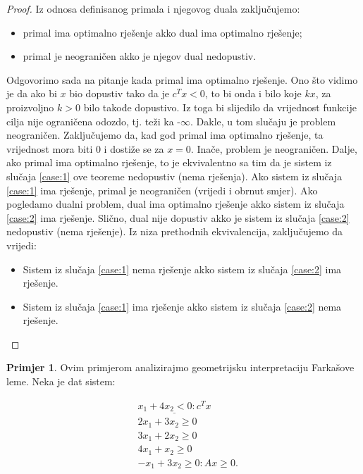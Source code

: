 \documentclass[a4paper, utf8, 11pt, colorlinks]{book}
\theoremstyle{definition}
\newtheorem{primjer}{Primjer}[chapter]
\begin{document}
\begin{proof}
Iz odnosa definisanog primala i njegovog duala zaključujemo:
  \begin{itemize}
  	\item primal ima optimalno rješenje akko  dual ima optimalno rješenje; 
  	\item primal je neograničen  akko je njegov dual nedopustiv.  
  \end{itemize}
  Odgovorimo sada na pitanje kada primal ima optimalno rješenje. Ono što vidimo je da ako bi $x$ bio dopustiv tako da je $c^Tx < 0$,  to bi onda i bilo koje $kx$, za proizvoljno $k>0$ bilo takođe dopustivo. Iz toga bi slijedilo da vrijednost funkcije cilja nije ograničena odozdo, tj. teži ka -$\infty$. Dakle, u tom slučaju je problem neograničen. Zaključujemo da, kad god  primal ima optimalno rješenje, ta vrijednost mora biti 0 i dostiže se za $x =0$. Inače, problem je neograničen. Dalje, ako primal ima optimalno rješenje, to  je ekvivalentno sa tim da je sistem iz slučaja  \ref{case:1} ove teoreme nedopustiv (nema rješenja).  Ako sistem iz slučaja  \ref{case:1}  ima rješenje, primal je neograničen (vrijedi i obrnut smjer). Ako pogledamo   dualni problem, dual ima optimalno rješenje akko sistem iz  slučaja  \ref{case:2}   ima rješenje. Slično, dual nije dopustiv akko je sistem iz  slučaja   \ref{case:2}  nedopustiv (nema rješenje). Iz niza prethodnih ekvivalencija, zaključujemo da vrijedi: 
  \begin{itemize}
  	  \item Sistem iz  slučaja  \ref{case:1}  nema rješenje akko sistem iz  slučaja  \ref{case:2}   ima rješenje. 
  	  \item Sistem iz  slučaja  \ref{case:1}  ima rješenje akko sistem iz  slučaja  \ref{case:2}  nema rješenje. 
   \end{itemize}
\end{proof}

\begin{primjer}
	Ovim primjerom analizirajmo geometrijsku interpretaciju Farkašove leme. Neka je dat sistem:
\end{primjer}

\begin{align*}
	& \underline{x_1 + 4 x_2  < 0: c^T x}\\  
	& 2 x_1 + 3 x_2 \geq 0 \\
	& 3 x_1 + 2 x_2 \geq 0 \\
	& 4 x_1 + x_2 \geq 0 \\
	& -x_1 + 3 x_2 \geq 0: Ax \geq 0.
\end{align*}
\end{document}
